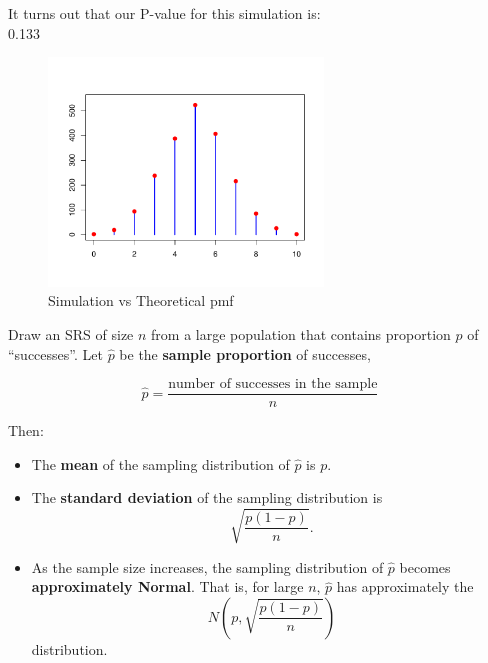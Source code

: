 It turns out that our P-value for this simulation is: \\
0.133
\begin{figure}[H]
  \centering
  \includegraphics[width=0.65\textwidth]{section11/images/sim_vs_theoretical_pmf.pdf}
  \caption{Simulation vs Theoretical pmf}
\end{figure}
\begin{tcolorbox}[colback=yellow!5, colframe=yellow!50!black, title={Sampling Distribution of a Sample Proportion}, sharp corners, boxrule=0.4pt, width=\textwidth, breakable]

Draw an SRS of size $n$ from a large population that contains proportion $p$ of “successes”. Let $\hat{p}$ be the \textbf{sample proportion} of successes,

\[
\hat{p} = \frac{\text{number of successes in the sample}}{n}
\]

Then:

\begin{itemize}
  \item The \textbf{mean} of the sampling distribution of $\hat{p}$ is $p$.
  \item The \textbf{standard deviation} of the sampling distribution is
  \[
  \sqrt{\frac{p(1 - p)}{n}}.
  \]
\end{itemize}

\vspace{0.75em}

\begin{itemize}
  \item As the sample size increases, the sampling distribution of $\hat{p}$ becomes \textbf{approximately Normal}. That is, for large $n$, $\hat{p}$ has approximately the
  \[
  N\left(p, \sqrt{\frac{p(1 - p)}{n}}\right)
  \]
  distribution.
\end{itemize}

\end{tcolorbox}
